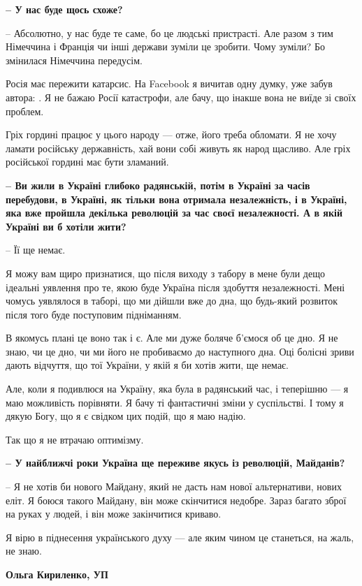{\bfseries 
– У нас буде щось схоже? 
}

– Абсолютно, у нас буде те саме, бо це людські пристрасті. Але разом з тим
Німеччина і Франція чи інші держави зуміли це зробити. Чому зуміли? Бо
змінилася Німеччина передусім. 

Росія має пережити катарсис. На Facebook я вичитав одну думку, уже забув
автора: . Я не бажаю Росії катастрофи, але бачу, що інакше вона
не виїде зі своїх проблем. 

Гріх гордині працює у цього народу --- отже, його треба обломати. Я не хочу
ламати російську державність, хай вони собі живуть як народ щасливо. Але гріх
російської гордині має бути зламаний.

\textbf{– Ви жили в Україні глибоко радянській, потім в Україні за часів перебудови, в
Україні, як тільки вона отримала незалежність, і в Україні, яка вже пройшла
декілька революцій за час своєї незалежності. А в якій Україні ви б хотіли
жити?}

– Її ще немає. 

Я можу вам щиро признатися, що після виходу з табору в мене були дещо ідеальні
уявлення про те, якою буде Україна після здобуття незалежності. Мені чомусь
уявлялося в таборі, що ми дійшли вже до дна, що будь-який розвиток після того
буде поступовим підніманням. 

В якомусь плані це воно так і є. Але ми дуже боляче б’ємося об це дно. Я не
знаю, чи це дно, чи ми його не пробиваємо до наступного дна. Оці болісні зриви
дають відчуття, що тої України, у якій я би хотів жити, ще немає. 

Але, коли я подивлюся на Україну, яка була в радянський час, і теперішню --- я
маю можливість порівняти. Я бачу ті фантастичні зміни у суспільстві. І тому я
дякую Богу, що я є свідком цих подій, що я маю надію.

Так що я не втрачаю оптимізму.

{\bfseries 
– У найближчі роки Україна ще переживе якусь із революцій, Майданів? 
}

– Я не хотів би нового Майдану, який не дасть нам нової альтернативи, нових
еліт. Я боюся такого Майдану, він може скінчитися недобре. Зараз багато зброї
на руках у людей, і він може закінчитися криваво. 

Я вірю в піднесення українського духу --- але яким чином це станеться, на жаль,
не знаю.

{\bfseries 
Ольга Кириленко, УП
}
